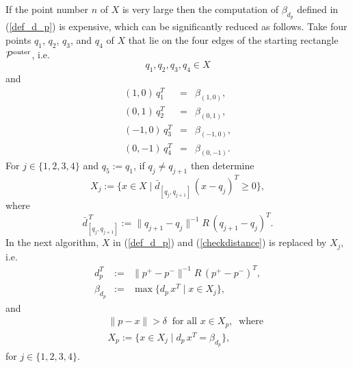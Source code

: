 \documentclass[12pt]{article}
\begin{document}
If the point number $n$ of $X$ is very large then the computation of $\beta_{d_{p}}$ defined in (\ref{def_d_p}) is expensive, which can be significantly reduced as follows. Take four points $q_1$, $q_2$, $q_3$, and $q_4$ of $X$ that lie on the four edges of the starting rectangle ${\cal P}^{\rm outer}$, i.e.
\begin{equation}\label{def_4q-1}
q_1, q_2, q_3, q_4 \in X
\end{equation}
and
\begin{equation}\label{def_4q-2}
\begin{array}{lcl}
(1, 0)\, q_1^T &=& \beta_{(1, 0)}, \\
(0, 1)\, q_2^T &=& \beta_{(0, 1)}, \\
(-1, 0)\, q_3^T &=& \beta_{(-1, 0)}, \\
(0, -1)\, q_4^T &=& \beta_{(0, -1)}.
\end{array}
\end{equation}
For $j \in \{1, 2, 3, 4\}$ and $q_5 := q_1$, if $q_j \not= q_{j+1}$ then determine
\begin{equation}\label{def_4Xj}
X_j := \{x \in X \mid \bar d_{[q_j, q_{j+1}]}\, (x - q_j)^T \geq 0\}, 
\end{equation}
where
\begin{equation}\label{def_4dqj}
\bar d_{[q_j, q_{j+1}]}^{\, T} := \|q_{j+1} - q_j\|^{-1} R\, (q_{j+1} - q_j)^T.
\end{equation}
In the next algorithm, $X$ in (\ref{def_d_p}) and (\ref{checkdistance}) is replaced by $X_j$, i.e.
\begin{equation}\label{def_d_p-new}
\begin{array}{lcl}
d_{p}^T &:=& \|p^+ - p^-\|^{-1} R \, (p^+ - p^-)^T, \\
\beta_{d_{p}} &:=& \max\{d_{p}\, x^T \mid x \in X_j\}, 
\end{array}
\end{equation}
and
\begin{equation}\label{checkdistance+}
\begin{array}{lcl}
&& \|p - x\| > \delta \ \mbox{ for all } x \in X_p, \ \mbox{ where} \\
&& X_p := \{x \in X_j \mid d_{p}\, x^T = \beta_{d_{p}}\},
\end{array}
\end{equation}
for $j \in \{1, 2, 3, 4\}$.
\end{document}
